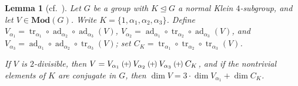 \documentclass[a4paper, 11pt]{amsart}
\theoremstyle{plain}
\newtheorem{lemma}[theorem]{Lemma}
\theoremstyle{definition}
\theoremstyle{remark}
\newcommand{\qoplus}{\mathbin{\scalerel*{\left(\mkern-2mu+\mkern-2mu\right)}{\bigcirc}}}
\DeclareMathOperator{\ad}{ad}
\DeclareMathOperator{\tr}{tr}
\newcommand{\Mod}{\mathbf{Mod}}
\begin{document}
\begin{lemma}[{cf.~\cite[Weight Lemma]{CDW23}}]\label{l.WeightLemma}
Let $G$ be a group with $K\trianglelefteq G$ a normal Klein $4$-subgroup, and let $V \in \Mod(G)$. Write $K=\{1,\alpha_1, \alpha_2, \alpha_3\}$. Define $V_{\alpha_1} = \tr_{\alpha_1} \circ \ad_{\alpha_2} \circ \ad_{\alpha_3}(V)$, $V_{\alpha_2} = \ad_{\alpha_1} \circ \tr_{\alpha_2} \circ \ad_{\alpha_3}(V)$, and $V_{\alpha_3} = \ad_{\alpha_1} \circ \ad_{\alpha_2} \circ \tr_{\alpha_3}(V)$;  set $C_K = \tr_{\alpha_1} \circ \tr_{\alpha_2} \circ \tr_{\alpha_3}(V)$.

If $V$ is $2$-divisible, then $V = V_{\alpha_1} \qoplus V_{\alpha_2} \qoplus V_{\alpha_3} \qoplus C_K$, and if the nontrivial elements of $K$ are conjugate in $G$, then $\dim V = 3\cdot\dim V_{\alpha_1} + \dim C_K$.
\end{lemma}
\end{document}
